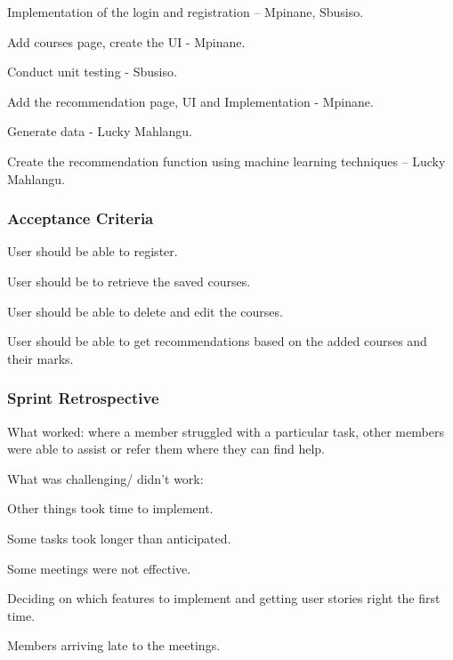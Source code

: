 \documentclass[10pt]{article}
\begin{document}
\begin{description}[font=$\bullet$~\normalfont\scshape\color{red!50!black}]

\item [] Implementation of the login and registration – Mpinane, Sbusiso.
\item [] Add courses page, create the UI - Mpinane.
\item [] Conduct unit testing - Sbusiso.
\item [] Add the recommendation page, UI and Implementation - Mpinane.
\item [] Generate data - Lucky Mahlangu.
\item [] Create the recommendation function using machine learning techniques – Lucky Mahlangu.
\end{description}

\subsubsection{Acceptance Criteria}

\begin{description}[font=$\bullet$~\normalfont\scshape\color{red!50!black}]

\item [] User should be able to register. 
\item [] User should be to retrieve the saved courses.
\item [] User should be able to delete and edit the courses.
\item [] User should be able to get recommendations based on the added courses and their marks.

\end{description}

\subsubsection{Sprint Retrospective}

What worked: where a member struggled with a particular task, other members were able to assist or refer them where they can find help.

What was challenging/ didn’t work:

\begin{description}[font=$\bullet$~\normalfont\scshape\color{red!50!black}]

\item [] Other things took time to implement.
\item [] Some tasks took longer than anticipated.
\item [] Some meetings were not effective. 
\item [] Deciding on which features to implement and getting user stories   right the first time.
\item [] Members arriving late to the meetings.

\end{description}
\end{document}
